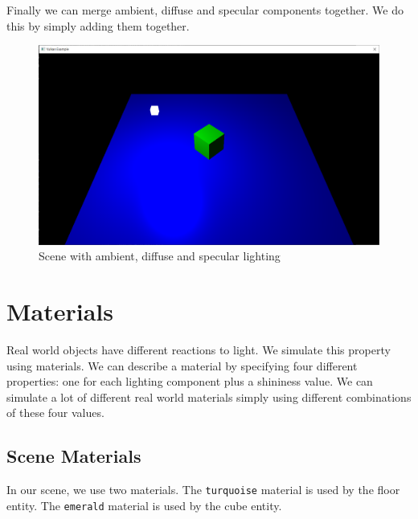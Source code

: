 Finally we can merge ambient, diffuse and specular components together.
We do this by simply adding them together.

\begin{minipage}{\linewidth}{\noindent}
    
\end{minipage}

\begin{figure}[H]
    \centering
    \includegraphics[scale=0.25]{images/ChBlinnPhong/SceneLit.png}
    \caption{Scene with ambient, diffuse and specular lighting}
    \label{fig::SceneLit}
\end{figure}

\section{Materials}

Real world objects have different reactions to light.
We simulate this property using materials.
We can describe a material by specifying four different properties:
one for each lighting component plus a shininess value.
We can simulate a lot of different real world materials simply using
different combinations of these four values.

\subsection{Scene Materials}

In our scene, we use two materials.
The \texttt{turquoise} material is used by the floor entity.
The \texttt{emerald} material is used by the cube entity.

